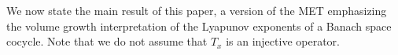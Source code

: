 \documentclass[11pt]{amsart}
\theoremstyle{theorem}
\newtheorem{thm}{Theorem}[section]
\theoremstyle{definition}
\numberwithin{equation}{section}
\renewcommand{\a}{\alpha}
\renewcommand{\l}{\lambda}
\newcommand{\codim}{\operatorname{codim}}
\begin{document}
%
We now state the main result of this paper, a version of the MET emphasizing the volume growth interpretation of the Lyapunov exponents of a Banach space cocycle. Note that we do not assume that $T_x$ is an injective operator.
\end{document}
